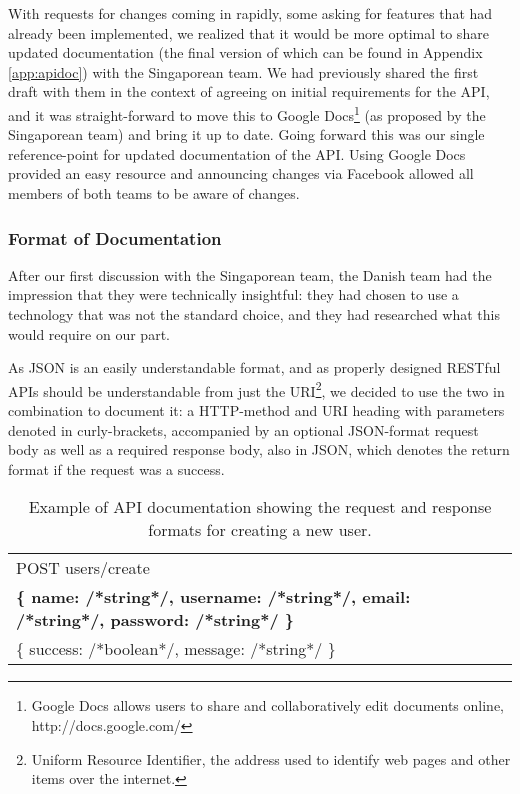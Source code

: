 With requests for changes coming in rapidly, some asking for features that had already been implemented, we
realized that it would be more optimal to share updated documentation (the final version of which can be found in
Appendix \ref{app:apidoc}) with the Singaporean team. We had previously
shared the first draft with them in the context of agreeing on initial requirements for the API, and it was
straight-forward to move this to Google Docs\footnote{Google Docs allows users to share and collaboratively edit
documents online, http://docs.google.com/} (as proposed by the Singaporean team) and bring it up to date. Going
forward this was our single reference-point for updated documentation of the API. Using Google Docs provided an easy
resource and announcing changes via Facebook allowed all members of both teams to be aware of changes.

\subsubsection{Format of Documentation}
After our first discussion with the Singaporean team, the Danish team had the
impression that they were technically insightful: they had chosen to use
a technology that was not the standard choice, and they had researched what
this would require on our part.

As JSON is an easily understandable format, and as properly designed
RESTful APIs should be understandable from just the URI\footnote{Uniform
Resource Identifier, the address used to identify web pages and other items over
the internet.}, we decided to use the two in combination to document it: a
HTTP-method and URI heading with parameters denoted in curly-brackets,
accompanied by an optional JSON-format request body as well as a required
response body, also in JSON, which denotes the return format if the request was
a success.

\begin{table}[hbt]
    \centering
    \scalebox{0.9}
    {\begin{tabular}{ | l | }
        \hline
        POST users/create \\
        \textbf{\{ name: /*string*/, username: /*string*/, email: /*string*/, password: /*string*/ \}} \\
        \{ success: /*boolean*/, message: /*string*/ \} \\
        \hline
    \end{tabular}}
    \caption{Example of API documentation showing the request and response formats for creating a new user.}
\end{table}

